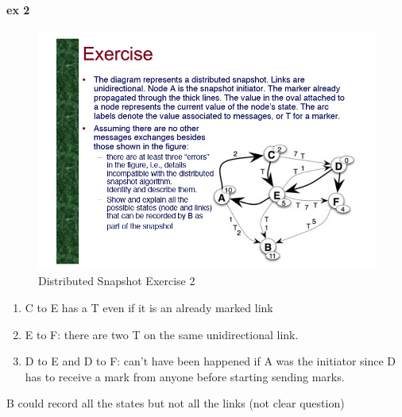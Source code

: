 \documentclass[11pt]{article}
\begin{document}
\paragraph{ex 2} %
\label{par:ex_2}
\begin{figure}[ht]
	\centering
	\includegraphics[scale=0.7]{figures/exercise_synch_4.jpg}
	\caption{Distributed Snapshot Exercise 2}
	\label{fig:dse2}
\end{figure}
\begin{enumerate}
	\item C to E has a T even if it is an already marked link
	\item E to F: there are two T on the same unidirectional link.
	\item D to E and D to F: can't have been happened if A was the initiator since D has to receive a mark from anyone before starting sending marks.
\end{enumerate}
B could record all the states but not all the links (not clear question)

\end{document}
